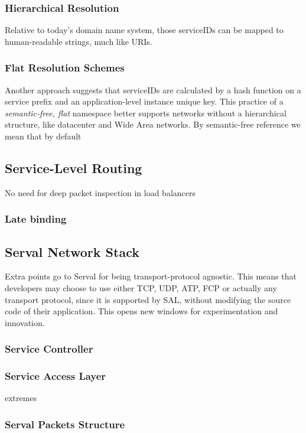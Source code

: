 \subsubsection{Hierarchical Resolution}
Relative to today's domain name system, those serviceIDs can be mapped to human-readable strings, much like URIs.

\subsubsection{Flat Resolution Schemes}
Another approach suggests that serviceIDs are calculated by a hash function on a service prefix and an application-level instance unique key.
This practice of a \emph{semantic-free, flat} namespace better supports networks without a hierarchical structure, like datacenter and Wide Area networks.
By semantic-free\cite{Walfisha2004} reference we mean that by default 

\subsection{Service-Level Routing} 
No need for deep packet inspection in load balancers


\subsubsection{Late binding}

\subsection{Serval Network Stack}
Extra points go to Serval for being transport-protocol agnostic.
This means that developers may choose to use either TCP, UDP, ATP, FCP or actually any transport protocol, since it is supported by SAL, without modifying the source code of their application.
This opens new windows for experimentation and innovation.

\subsubsection{Service Controller}

\subsubsection{Service Access Layer}
extremes
\subsubsection{Serval Packets Structure}


